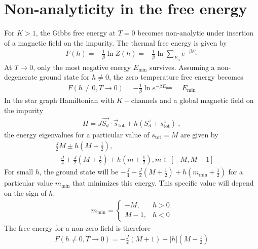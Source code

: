 \documentclass{revtex4-2}
\numberwithin{equation}{section}
\begin{document}
\section{Non-analyticity in the free energy}
For \(K>1\), the Gibbs free energy at \(T=0\) becomes non-analytic under insertion of a magnetic field on the impurity. The thermal free energy is given by
\begin{equation}\begin{aligned}
	F(h) = -\frac{1}{\beta}\ln Z(h) = -\frac{1}{\beta}\ln\sum_{E_n}e^{-\beta E_n}
\end{aligned}\end{equation}
At \(T \to 0\), only the most negative energy \(E_\text{min}\) survives. Assuming a non-degenerate ground state for \(h \neq 0\), the zero temperature free energy becomes
\begin{equation}\begin{aligned}
	F(h\neq 0, T\to 0) = -\frac{1}{\beta}\ln e^{-\beta E_\text{min}} = E_\text{min}
\end{aligned}\end{equation}
In the star graph Hamiltonian with \(K-\)channels and a global magnetic field on the impurity
\begin{equation}\begin{aligned}
	H = J \vec{S_d}\cdot\vec{s}_\text{tot} + h\left(S_d^z + s^z_\text{tot}\right) ~,
\end{aligned}\end{equation}
the energy eigenvalues for a particular value of \(s_\text{tot}=M\) are given by
\begin{equation}\begin{aligned}
	&\frac{J}{2}M \pm h\left(M + \frac{1}{2}\right),\\
	&-\frac{J}{4}\pm \frac{J}{2}\left(M + \frac{1}{2}\right) + h\left( m + \frac{1}{2} \right), m \in \left[-M, M-1\right] 
\end{aligned}\end{equation}
For small \(h\), the ground state will be \(-\frac{J}{4}- \frac{J}{2}\left(M + \frac{1}{2}\right) + h\left(m_\text{min} + \frac{1}{2} \right)\) for a particular value \(m_\text{min}\) that minimizes this energy. This specific value will depend on the sign of \(h\):
\begin{equation}\begin{aligned}
	m_\text{min} = \begin{cases}
		-M, & h >0\\
		M-1,& h< 0
	\end{cases}
\end{aligned}\end{equation}
The free energy for a non-zero field is therefore
\begin{equation}\begin{aligned}
	F(h\neq 0, T\to 0) = -\frac{J}{2}\left( M + 1 \right) - |h|\left(M - \frac{1}{2}\right)
\end{aligned}\end{equation}
\end{document}
